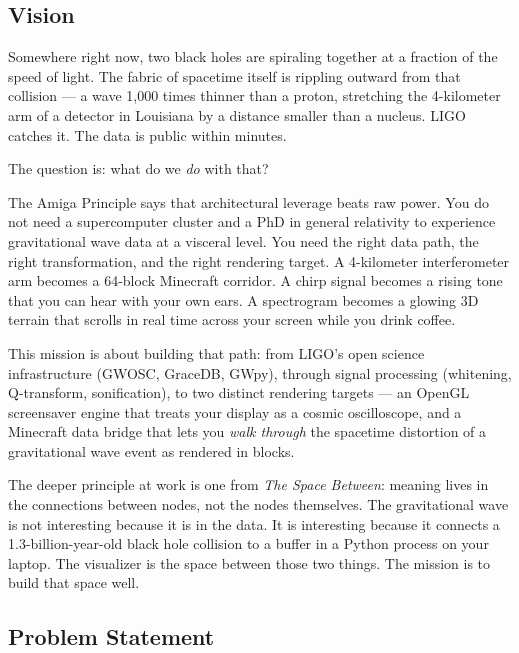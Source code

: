 \documentclass[11pt,letterpaper]{article}
\begin{document}
\subsection{Vision}

Somewhere right now, two black holes are spiraling together at a fraction of the speed of light. The fabric of spacetime itself is rippling outward from that collision --- a wave 1,000 times thinner than a proton, stretching the 4-kilometer arm of a detector in Louisiana by a distance smaller than a nucleus. LIGO catches it. The data is public within minutes.

The question is: what do we \emph{do} with that?

The Amiga Principle says that architectural leverage beats raw power. You do not need a supercomputer cluster and a PhD in general relativity to experience gravitational wave data at a visceral level. You need the right data path, the right transformation, and the right rendering target. A 4-kilometer interferometer arm becomes a 64-block Minecraft corridor. A chirp signal becomes a rising tone that you can hear with your own ears. A spectrogram becomes a glowing 3D terrain that scrolls in real time across your screen while you drink coffee.

This mission is about building that path: from LIGO's open science infrastructure (GWOSC, GraceDB, GWpy), through signal processing (whitening, Q-transform, sonification), to two distinct rendering targets --- an OpenGL screensaver engine that treats your display as a cosmic oscilloscope, and a Minecraft data bridge that lets you \emph{walk through} the spacetime distortion of a gravitational wave event as rendered in blocks.

The deeper principle at work is one from \emph{The Space Between}: meaning lives in the connections between nodes, not the nodes themselves. The gravitational wave is not interesting because it is in the data. It is interesting because it connects a 1.3-billion-year-old black hole collision to a buffer in a Python process on your laptop. The visualizer is the space between those two things. The mission is to build that space well.

\subsection{Problem Statement}
\end{document}
